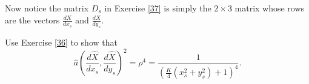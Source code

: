 \documentclass{ximera}
\begin{document}
Now notice the matrix $D_{s}$ in Exercise \ref{37} is simply the $2\times3$
matrix whose rows are the vectors $\frac{dX}{dx_{s}}$ and $\frac{dX}{dy_{s}}$.

\begin{exercise}
Use Exercise \ref{36} to show that%
\[
\hat{a}\left(  \frac{d\hat{X}}{dx_{s}},\frac{d\hat{X}}{dy_{s}}\right)
^{2}=\rho^{4}=\frac{1}{\left(  \frac{K}{4}\left(  x_{s}^{2}+y_{s}^{2}\right)
+1\right)  ^{4}}.
\]

\end{exercise}
\end{document}
